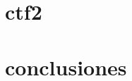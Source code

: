\documentclass[a4paper, 12pt]{article} %
\begin{document}
\begin{otherlanguage}{spanish}
    \newpage
    \section{ctf2}

    \newpage
    \section{conclusiones}

    \newpage
    \printbibliography[heading=bibnumbered] %

\end{otherlanguage}
\end{document}
